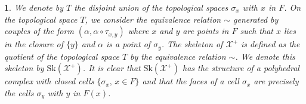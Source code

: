 \documentclass{amsart}%
\numberwithin{equation}{subsection}
\theoremstyle{plain2}
\theoremstyle{definition2}
\theoremstyle{stepstyle}
\theoremstyle{point}
\theoremstyle{subpoint}
\newtheorem{subpoint}[equation]{}%
\newcommand{\spa}[1]{\begin{subpoint}#1\end{subpoint}}           %
\newcommand{\cX}{\ensuremath{\mathscr{X}}}
\newcommand{\Sk}{\mathrm{Sk}}
\begin{document}
\spa{  We denote by $T$ the disjoint union of the topological
spaces
 $\sigma_x$ with $x$ in $F$. On the topological space $T$,
 we consider the equivalence relation $\sim$ generated by couples
 of the form $(\alpha,\alpha\circ \tau_{x,y})$ where $x$ and $y$
 are points in $F$ such that $x$ lies in the closure of $\{y\}$
 and $\alpha$ is a point of $\sigma_y$.
 The skeleton of $\cX^+$ is
 defined as the quotient of the topological space $T$ by the equivalence relation
 $\sim$. We denote this skeleton by $\Sk(\cX^+)$. It is clear that $\Sk(\cX^+)$ has the structure of a polyhedral
 complex with closed cells $\{\sigma_x,\,x\in F\}$ and that the faces of
 a cell $\sigma_x$ are precisely the cells $\sigma_y$ with $y$ in
 $F(x)$. 
 }
 
\end{document}
